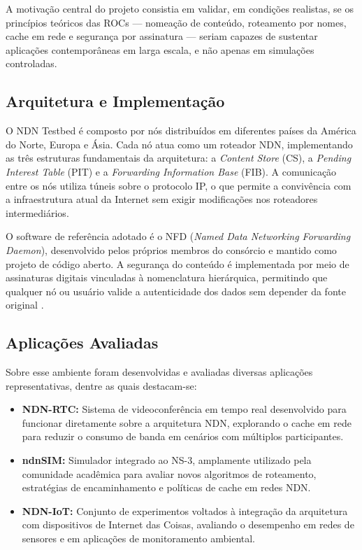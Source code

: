 \documentclass[12pt]{article}
\begin{document}
A motivação central do projeto consistia em validar, em condições realistas, se os princípios teóricos das ROCs — nomeação de conteúdo, roteamento por nomes, cache em rede e segurança por assinatura — seriam capazes de sustentar aplicações contemporâneas em larga escala, e não apenas em simulações controladas.

\subsection{Arquitetura e Implementação}

O NDN Testbed é composto por nós distribuídos em diferentes países da América do Norte, Europa e Ásia. Cada nó atua como um roteador NDN, implementando as três estruturas fundamentais da arquitetura: a \textit{Content Store} (CS), a \textit{Pending Interest Table} (PIT) e a \textit{Forwarding Information Base} (FIB). A comunicação entre os nós utiliza túneis sobre o protocolo IP, o que permite a convivência com a infraestrutura atual da Internet sem exigir modificações nos roteadores intermediários.

O software de referência adotado é o NFD (\textit{Named Data Networking Forwarding Daemon}), desenvolvido pelos próprios membros do consórcio e mantido como projeto de código aberto. A segurança do conteúdo é implementada por meio de assinaturas digitais vinculadas à nomenclatura hierárquica, permitindo que qualquer nó ou usuário valide a autenticidade dos dados sem depender da fonte original \cite{afanasyev2018brief}.

\subsection{Aplicações Avaliadas}

Sobre esse ambiente foram desenvolvidas e avaliadas diversas aplicações representativas, dentre as quais destacam-se:

\begin{itemize}

\item \textbf{NDN-RTC:}
Sistema de videoconferência em tempo real desenvolvido para funcionar diretamente sobre a arquitetura NDN, explorando o cache em rede para reduzir o consumo de banda em cenários com múltiplos participantes.

\item \textbf{ndnSIM:}
Simulador integrado ao NS-3, amplamente utilizado pela comunidade acadêmica para avaliar novos algoritmos de roteamento, estratégias de encaminhamento e políticas de cache em redes NDN.

\item \textbf{NDN-IoT:}
Conjunto de experimentos voltados à integração da arquitetura com dispositivos de Internet das Coisas, avaliando o desempenho em redes de sensores e em aplicações de monitoramento ambiental.

\end{itemize}
\end{document}

